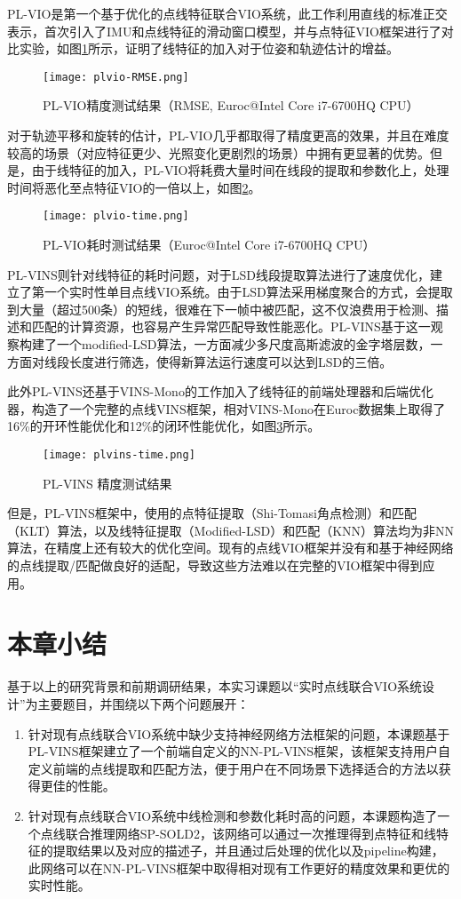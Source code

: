 PL-VIO\cite{he2018pl}是第一个基于优化的点线特征联合VIO系统，此工作利用直线的标准正交表示，首次引入了IMU和点线特征的滑动窗口模型，并与点特征VIO框架进行了对比实验，如图\ref{fig_PLVIO_RMSE}所示，证明了线特征的加入对于位姿和轨迹估计的增益。
\begin{figure}
  \centering
  \texttt{[image: plvio-RMSE.png]}
  \caption{PL-VIO精度测试结果（RMSE, Euroc@Intel Core i7-6700HQ CPU）}
  \label{fig_PLVIO_RMSE}
\end{figure}
对于轨迹平移和旋转的估计，PL-VIO几乎都取得了精度更高的效果，并且在难度较高的场景（对应特征更少、光照变化更剧烈的场景）中拥有更显著的优势。但是，由于线特征的加入，PL-VIO将耗费大量时间在线段的提取和参数化上，处理时间将恶化至点特征VIO的一倍以上，如图\ref{fig_PLVIO_TIME}。
\begin{figure}
  \centering
  \texttt{[image: plvio-time.png]}
  \caption{PL-VIO耗时测试结果（Euroc@Intel Core i7-6700HQ CPU）}
  \label{fig_PLVIO_TIME}
\end{figure}

PL-VINS\cite{fu2020pl}则针对线特征的耗时问题，对于LSD线段提取算法进行了速度优化，建立了第一个实时性单目点线VIO系统。由于LSD算法采用梯度聚合的方式，会提取到大量（超过500条）的短线，很难在下一帧中被匹配，这不仅浪费用于检测、描述和匹配的计算资源，也容易产生异常匹配导致性能恶化。PL-VINS基于这一观察构建了一个modified-LSD算法，一方面减少多尺度高斯滤波的金字塔层数，一方面对线段长度进行筛选，使得新算法运行速度可以达到LSD的三倍。

此外PL-VINS还基于VINS-Mono\cite{qin2018vins}的工作加入了线特征的前端处理器和后端优化器，构造了一个完整的点线VINS框架，相对VINS-Mono在Euroc数据集上取得了16\%的开环性能优化和12\%的闭环性能优化，如图\ref{fig_PLVINS_PREC}所示。
\begin{figure}
  \centering
  \texttt{[image: plvins-time.png]}
  \caption{PL-VINS 精度测试结果}
  \label{fig_PLVINS_PREC}
\end{figure}
但是，PL-VINS框架中，使用的点特征提取（Shi-Tomasi角点检测）和匹配（KLT）算法，以及线特征提取（Modified-LSD）和匹配（KNN）算法均为非NN算法，在精度上还有较大的优化空间。现有的点线VIO框架并没有和基于神经网络的点线提取/匹配做良好的适配，导致这些方法难以在完整的VIO框架中得到应用。

\section{本章小结}
\label{outline}
基于以上的研究背景和前期调研结果，本实习课题以“实时点线联合VIO系统设计”为主要题目，并围绕以下两个问题展开：
\begin{enumerate}
  \item 针对现有点线联合VIO系统中缺少支持神经网络方法框架的问题，本课题基于PL-VINS框架建立了一个前端自定义的NN-PL-VINS框架，该框架支持用户自定义前端的点线提取和匹配方法，便于用户在不同场景下选择适合的方法以获得更佳的性能。
  \item 针对现有点线联合VIO系统中线检测和参数化耗时高的问题，本课题构造了一个点线联合推理网络SP-SOLD2，该网络可以通过一次推理得到点特征和线特征的提取结果以及对应的描述子，并且通过后处理的优化以及pipeline构建，此网络可以在NN-PL-VINS框架中取得相对现有工作更好的精度效果和更优的实时性能。
\end{enumerate}


